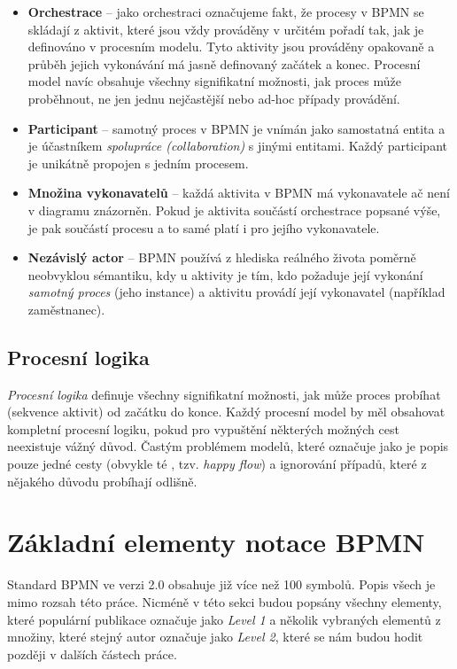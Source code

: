\documentclass[]{article}
\begin{document}
\begin{itemize}
\item \textbf{Orchestrace} – jako orchestraci označujeme fakt, že procesy v BPMN se skládají z aktivit, které jsou vždy prováděny v určitém pořadí tak, jak je definováno v procesním modelu. Tyto aktivity jsou prováděny opakovaně a průběh jejich vykonávání má jasně definovaný začátek a konec. Procesní model navíc obsahuje všechny signifikatní možnosti, jak proces může proběhnout, ne jen jednu nejčastější nebo ad-hoc případy provádění.
\item \textbf{Participant} – samotný proces v BPMN je vnímán jako samostatná entita a je účastníkem \textit{spolupráce (collaboration)} s jinými entitami. Každý participant je unikátně propojen s jedním procesem.
\item \textbf{Množina vykonavatelů} – každá aktivita v BPMN má vykonavatele ač není v diagramu znázorněn. Pokud je aktivita součástí orchestrace popsané výše, je pak součástí procesu a to samé platí i pro jejího vykonavatele.
\item \textbf{Nezávislý actor} – BPMN používá z hlediska reálného života poměrně neobvyklou sémantiku, kdy u aktivity je tím, kdo požaduje její vykonání \textit{samotný proces} (jeho instance) a aktivitu provádí její vykonavatel (například zaměstnanec).
\end{itemize}

\subsection{Procesní logika}
\textit{Procesní logika} definuje všechny signifikatní možnosti, jak může proces probíhat (sekvence aktivit) od začátku do konce. Každý procesní model by měl obsahovat kompletní procesní logiku, pokud pro vypuštění některých možných cest neexistuje vážný důvod. Častým problémem modelů, které \cite{Silver2011} označuje jako  je popis pouze jedné cesty (obvykle té , tzv. \textit{happy flow}) a ignorování případů, které z nějakého důvodu probíhají odlišně.

\section{Základní elementy notace BPMN}

Standard BPMN ve verzi 2.0 obsahuje již více než 100 symbolů. Popis všech je mimo rozsah této práce. Nicméně v této sekci budou popsány všechny elementy, které populární publikace \cite{Silver2011} označuje jako \textit{Level 1} a několik vybraných elementů z množiny, které stejný autor označuje jako \textit{Level 2}, které se nám budou hodit později v dalších částech práce.
\end{document}
